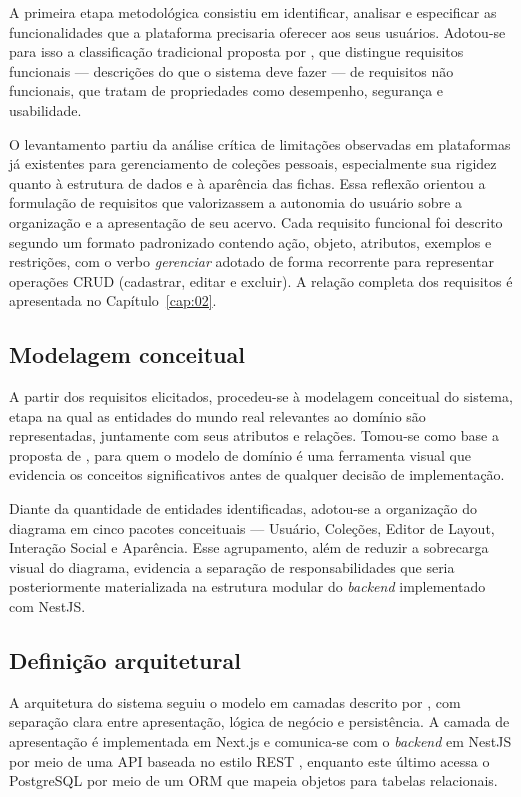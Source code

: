 A primeira etapa metodológica consistiu em identificar, analisar e especificar as funcionalidades que a plataforma precisaria oferecer aos seus usuários. Adotou-se para isso a classificação tradicional proposta por \cite{Sommerville2011}, que distingue requisitos funcionais --- descrições do que o sistema deve fazer --- de requisitos não funcionais, que tratam de propriedades como desempenho, segurança e usabilidade.

O levantamento partiu da análise crítica de limitações observadas em plataformas já existentes para gerenciamento de coleções pessoais, especialmente sua rigidez quanto à estrutura de dados e à aparência das fichas. Essa reflexão orientou a formulação de requisitos que valorizassem a autonomia do usuário sobre a organização e a apresentação de seu acervo. Cada requisito funcional foi descrito segundo um formato padronizado contendo ação, objeto, atributos, exemplos e restrições, com o verbo \textit{gerenciar} adotado de forma recorrente para representar operações CRUD (cadastrar, editar e excluir). A relação completa dos requisitos é apresentada no Capítulo~\ref{cap:02}.

\subsection{Modelagem conceitual}

A partir dos requisitos elicitados, procedeu-se à modelagem conceitual do sistema, etapa na qual as entidades do mundo real relevantes ao domínio são representadas, juntamente com seus atributos e relações. Tomou-se como base a proposta de \cite{Larman2007}, para quem o modelo de domínio é uma ferramenta visual que evidencia os conceitos significativos antes de qualquer decisão de implementação.

Diante da quantidade de entidades identificadas, adotou-se a organização do diagrama em cinco pacotes conceituais --- Usuário, Coleções, Editor de Layout, Interação Social e Aparência. Esse agrupamento, além de reduzir a sobrecarga visual do diagrama, evidencia a separação de responsabilidades que seria posteriormente materializada na estrutura modular do \textit{backend} implementado com NestJS.

\subsection{Definição arquitetural}

A arquitetura do sistema seguiu o modelo em camadas descrito por \textcite{Fowler2002}, com separação clara entre apresentação, lógica de negócio e persistência. A camada de apresentação é implementada em Next.js e comunica-se com o \textit{backend} em NestJS por meio de uma API baseada no estilo REST \cite{Fielding2000}, enquanto este último acessa o PostgreSQL por meio de um ORM que mapeia objetos para tabelas relacionais.

